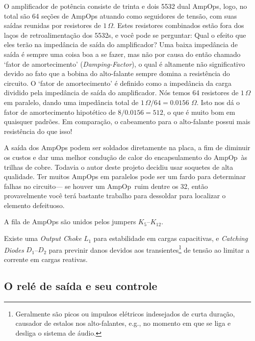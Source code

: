 \documentclass[12pt, a4paper, leqno, twoside]{book}
\def\ohm{\,\Omega}
\def\ampop{AmpOp}
\begin{document}
  O amplificador de pot\^encia consiste de trinta e dois 5532 dual \ampop{s}, logo, no total s\~ao 64 se\c c\~oes de \ampop{s} atuando como seguidores de tens\~ao, com suas sa\'idas reunidas por resistores de $1\ohm$. Estes resistores combinados est\~ao fora dos la\c cos de retroalimenta\c c\~ao dos 5532s, e voc\^e pode se perguntar: Qual o efeito que eles ter\~ao na imped\^ancia de sa\'ida do amplificador? Uma baixa imped\^ancia de sa\'ida \'e sempre uma coisa boa a se fazer, mas n\~ao por causa do ent\~ao chamado `fator de amortecimento' ({\it Damping-Factor}\/), o qual \'e altamente n\~ao significativo devido ao fato que a bobina do alto-falante sempre domina a resist\^encia do circuito. O `fator de amortecimento' \'e definido como a imped\^ancia da carga dividido pela imped\^ancia de sa\'ida do amplificador. N\'os temos 64 resistores de $1\ohm$ em paralelo, dando uma imped\^ancia total de $1\ohm/64=0.0156\,\ohm$. Isto nos d\'a o fator de amortecimento hipot\'etico de $8/0.0156=512$, o que \'e muito bom em quaisquer padr\~oes. Em compara\c c\~ao, o cabeamento para o alto-falante possui mais resist\^encia do que isso!

  A sa\'ida dos \ampop{s} podem ser soldados diretamente na placa, a fim de diminuir os custos e dar uma melhor condu\c c\~ao de calor do encapsulamento do \ampop\ \`as trilhas de cobre. Todavia o autor deste projeto decidiu usar soquetes de alta qualidade. Ter muitos \ampop{s} em paralelos pode ser um fardo para determinar falhas no circuito--- se houver um \ampop\ ruim dentre os 32, ent\~ao provavelmente voc\^e ter\'a bastante trabalho para dessoldar para localizar o elemento defeituoso. 

  A fila de \ampop{s} s\~ao unidos pelos jumpers $K_5$--$K_{12}$.

  Existe uma {\it Output Choke} $L_1$ para estabilidade em cargas capacitivas, e {\it Catching Diodes} $D_1$--$D_2$ para previnir danos devidos aos transientes\footnote{Geralmente s\~ao picos ou impulsos el\'etricos indesejados de curta dura\c c\~ao, causador de estalos nos alto-falantes, e.g., no momento em que se liga e desliga o sistema de \'audio.} de tens\~ao ao limitar a corrente em cargas reativas. 

  \subsection{O rel\'e de sa\'ida e seu controle}
\end{document}
